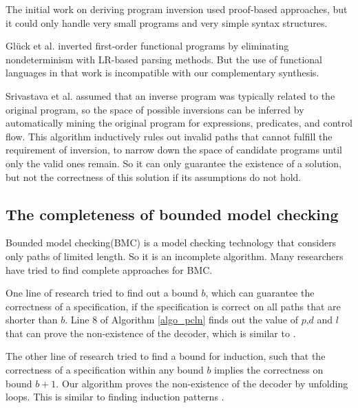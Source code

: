 \documentclass[journal]{IEEEtran}
\begin{document}
The initial work on deriving program inversion used proof-based approaches\cite{prog_inv},
but it could only handle very small programs and very simple syntax structures.

Gl\"{u}ck et al. \cite{mtd_autoProginv} inverted first-order functional programs
by eliminating nondeterminism with LR-based parsing methods.
But the use of functional languages in that work is incompatible with our complementary synthesis.

{Srivastava et al. \cite{prog_inv_rev} assumed that an inverse program was typically related to the original program,
so the space of possible inversions can be inferred by automatically
mining the original program for expressions, predicates, and control flow.
This algorithm inductively rules out invalid paths that cannot fulfill the requirement of inversion,
to narrow down the space of candidate programs until only the valid ones remain.
So it can only guarantee the existence of a solution,
but not the correctness of this solution if its assumptions do not hold.

\subsection{The completeness of bounded model checking}\label{subsec_bmc_relate}
Bounded model checking(BMC) \cite{bmc_tacas99} is a model checking technology that considers only paths of limited length.
So it is an incomplete algorithm.
Many researchers have tried to find complete approaches for BMC.

One line of research\cite{bmc_tacas99,RecDiam} tried to find out a bound $b$,
which can guarantee the correctness of a specification,
if the specification is correct on all paths that are shorter than $b$.
Line 8 of Algorithm \ref{algo_pcln} finds out the value of $p$,$d$ and $l$ that can prove the non-existence of the decoder,
which is similar to \cite{bmc_tacas99,RecDiam}.

The other line of research\cite{kind_tacas99} tried to find a bound for induction,
such that the correctness of a specification within any bound $b$ implies the correctness on bound $b+1$.
Our algorithm proves the non-existence of the decoder by unfolding loops.
This is similar to finding induction patterns \cite{kind_tacas99}.


}
\end{document}
